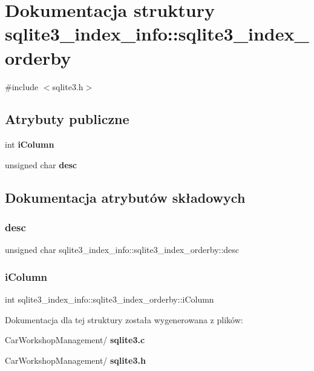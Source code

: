 \section{Dokumentacja struktury sqlite3\+\_\+index\+\_\+info\+::sqlite3\+\_\+index\+\_\+orderby}
\label{structsqlite3__index__info_1_1sqlite3__index__orderby}


{\ttfamily \#include $<$sqlite3.\+h$>$}

\subsection*{Atrybuty publiczne}
\begin{DoxyCompactItemize}
\item 
int \textbf{ i\+Column}
\item 
unsigned char \textbf{ desc}
\end{DoxyCompactItemize}


\subsection{Dokumentacja atrybutów składowych}
\mbox{\label{structsqlite3__index__info_1_1sqlite3__index__orderby_a0586d1b5d36221af96aeba8cfc56e9c6}} 
\subsubsection{desc}
{\footnotesize\ttfamily unsigned char sqlite3\+\_\+index\+\_\+info\+::sqlite3\+\_\+index\+\_\+orderby\+::desc}

\mbox{\label{structsqlite3__index__info_1_1sqlite3__index__orderby_a266396085bfda9acef3f13eaa170cd2f}} 
\subsubsection{iColumn}
{\footnotesize\ttfamily int sqlite3\+\_\+index\+\_\+info\+::sqlite3\+\_\+index\+\_\+orderby\+::i\+Column}



Dokumentacja dla tej struktury została wygenerowana z plików\+:\begin{DoxyCompactItemize}
\item 
Car\+Workshop\+Management/\textbf{ sqlite3.\+c}\item 
Car\+Workshop\+Management/\textbf{ sqlite3.\+h}\end{DoxyCompactItemize}
